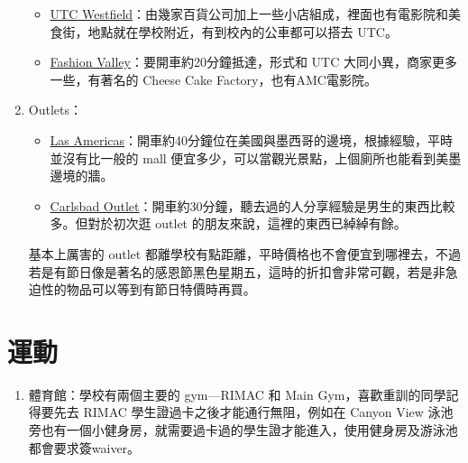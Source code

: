 \documentclass[10pt,a4paper]{book}
\begin{document}
\begin{CJK}{UTF8}{bkai}
\begin{enumerate}
    \begin{itemize}
    \item \href{http://www.westfield.com/utc/}{UTC Westfield}：由幾家百貨公司加上一些小店組成，裡面也有電影院和美食街，地點就在學校附近，有到校內的公車都可以搭去 UTC。
    \item \href{http://www.simon.com/mall/fashion-valley}{Fashion Valley}：要開車約20分鐘抵達，形式和 UTC 大同小異，商家更多一些，有著名的 Cheese Cake Factory，也有AMC電影院。
    \end{itemize}

\item Outlets：

    \begin{itemize}
    \item \href{http://www.premiumoutlets.com/outlets/outlet.asp?id=76}{Las Americas}：開車約40分鐘位在美國與墨西哥的邊境，根據經驗，平時並沒有比一般的 mall 便宜多少，可以當觀光景點，上個廁所也能看到美墨邊境的牆。
    \item \href{http://www.premiumoutlets.com/outlets/outlet.asp?id=66}{Carlsbad Outlet}：開車約30分鐘，聽去過的人分享經驗是男生的東西比較多。但對於初次逛 outlet 的朋友來說，這裡的東西已綽綽有餘。
    \end{itemize}

    基本上厲害的 outlet 都離學校有點距離，平時價格也不會便宜到哪裡去，不過若是有節日像是著名的感恩節黑色星期五，這時的折扣會非常可觀，若是非急迫性的物品可以等到有節日特價時再買。
\end{enumerate}

\section{運動}
\begin{enumerate}
\item 體育館：學校有兩個主要的 gym---RIMAC 和 Main Gym，喜歡重訓的同學記得要先去 RIMAC 學生證過卡之後才能通行無阻，例如在 Canyon View 泳池旁也有一個小健身房，就需要過卡過的學生證才能進入，使用健身房及游泳池都會要求簽waiver。


\end{enumerate}
\end{CJK}
\end{document}
